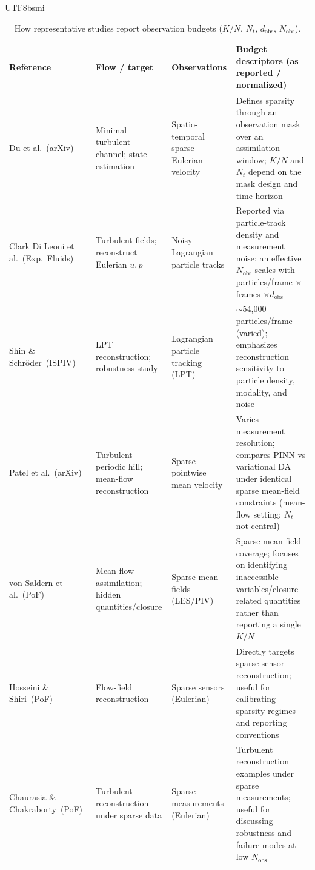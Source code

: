 \documentclass[master]{NTHUthesis}
\begin{document}
\begin{CJK*}{UTF8}{bsmi}
\begin{table}[!htbp]
    \centering
    \caption{How representative studies report observation budgets ($K/N$, $N_t$, $d_{\text{obs}}$, $N_{\text{obs}}$).}
    \label{tab:obs_budget_literature}
    \footnotesize
    \begin{tabularx}{\textwidth}{
        >{\raggedright\arraybackslash}p{3.6cm}
        >{\raggedright\arraybackslash}p{3.0cm}
        >{\raggedright\arraybackslash}p{3.0cm}
        X
    }
    \toprule
    \textbf{Reference} & \textbf{Flow / target} & \textbf{Observations} & \textbf{Budget descriptors (as reported / normalized)} \\
    \midrule
    Du et al.\ (arXiv)~\cite{du2022stateestimationminimalturbulent} & Minimal turbulent channel; state estimation & Spatio-temporal sparse Eulerian velocity & Defines sparsity through an observation mask over an assimilation window; $K/N$ and $N_t$ depend on the mask design and time horizon \\
    Clark Di Leoni et al.\ (Exp.\ Fluids)~\cite{Clark_Di_Leoni_2023} & Turbulent fields; reconstruct Eulerian $u,p$ & Noisy Lagrangian particle tracks & Reported via particle-track density and measurement noise; an effective $N_{\text{obs}}$ scales with particles/frame $\times$ frames $\times d_{\text{obs}}$ \\
    Shin \& Schr{\"o}der\ (ISPIV)~\cite{shin2025robust} & LPT reconstruction; robustness study & Lagrangian particle tracking (LPT) & $\sim$54{,}000 particles/frame (varied); emphasizes reconstruction sensitivity to particle density, modality, and noise \\
    Patel et al.\ (arXiv)~\cite{patel2024turbulencemodelaugmentedphysics} & Turbulent periodic hill; mean-flow reconstruction & Sparse pointwise mean velocity & Varies measurement resolution; compares PINN vs variational DA under identical sparse mean-field constraints (mean-flow setting: $N_t$ not central) \\
    von Saldern et al.\ (PoF)~\cite{von_Saldern_2022} & Mean-flow assimilation; hidden quantities/closure & Sparse mean fields (LES/PIV) & Sparse mean-field coverage; focuses on identifying inaccessible variables/closure-related quantities rather than reporting a single $K/N$ \\
    Hosseini \& Shiri\ (PoF)~\cite{10.1063/5.0211680} & Flow-field reconstruction & Sparse sensors (Eulerian) & Directly targets sparse-sensor reconstruction; useful for calibrating sparsity regimes and reporting conventions \\
    Chaurasia \& Chakraborty\ (PoF)~\cite{10.1063/5.0218611} & Turbulent reconstruction under sparse data & Sparse measurements (Eulerian) & Turbulent reconstruction examples under sparse measurements; useful for discussing robustness and failure modes at low $N_{\text{obs}}$ \\
    \bottomrule
    \end{tabularx}
\end{table}
\FloatBarrier


\end{CJK*}
\end{document}
